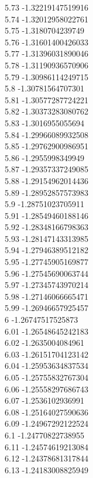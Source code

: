 {5.73	-1.32219147519916\\
5.74	-1.32012958022761\\
5.75	-1.3180704239749\\
5.76	-1.31601400426033\\
5.77	-1.31396031890046\\
5.78	-1.31190936570906\\
5.79	-1.30986114249715\\
5.8	-1.30781564707301\\
5.81	-1.30577287724221\\
5.82	-1.30373283080762\\
5.83	-1.3016955055694\\
5.84	-1.29966089932508\\
5.85	-1.29762900986951\\
5.86	-1.2955998349949\\
5.87	-1.29357337249085\\
5.88	-1.29154962014436\\
5.89	-1.28952857573983\\
5.9	-1.28751023705911\\
5.91	-1.28549460188146\\
5.92	-1.28348166798363\\
5.93	-1.28147143313985\\
5.94	-1.27946389512182\\
5.95	-1.27745905169877\\
5.96	-1.27545690063744\\
5.97	-1.27345743970214\\
5.98	-1.27146066665471\\
5.99	-1.26946657925457\\
6	-1.26747517525873\\
6.01	-1.26548645242183\\
6.02	-1.2635004084961\\
6.03	-1.26151704123142\\
6.04	-1.25953634837534\\
6.05	-1.25755832767304\\
6.06	-1.25558297686743\\
6.07	-1.2536102936991\\
6.08	-1.25164027590636\\
6.09	-1.24967292122524\\
6.1	-1.24770822738955\\
6.11	-1.24574619213084\\
6.12	-1.24378681317844\\
6.13	-1.24183008825949\\
}
